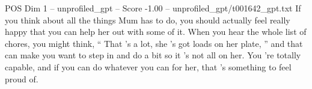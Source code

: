 \begin{textsample}{POS Dim 1 – unprofiled\_gpt – Score -1.00 – unprofiled\_gpt/t001642\_gpt.txt}  \label{ex:f1_pos_025}
If you think about all the things Mum has to do, you should actually feel really happy that you can help her out with some of it.
When you hear the whole list of chores, you might think, “ That ’s a lot, she ’s got loads on her plate, ” and that can make you want to step in and do a bit so it ’s not all on her.
You ’re totally capable, and if you can do whatever you can for her, that ’s something to feel proud of.

\end{textsample}
